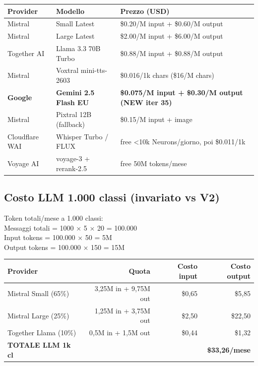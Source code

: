 \documentclass[12pt,a4paper]{article}
\begin{document}
\begin{center}
\begin{tabular}{lll}
\toprule
\textbf{Provider} & \textbf{Modello} & \textbf{Prezzo (USD)} \\
\midrule
Mistral & Small Latest          & \$0.20/M input + \$0.60/M output \\
Mistral & Large Latest          & \$2.00/M input + \$6.00/M output \\
Together AI & Llama 3.3 70B Turbo & \$0.88/M input + \$0.88/M output \\
Mistral & Voxtral mini-tts-2603 & \$0.016/1k chars (\$16/M chars) \\
\textbf{Google} & \textbf{Gemini 2.5 Flash EU} & \textbf{\$0.075/M input + \$0.30/M output (NEW iter 35)} \\
Mistral & Pixtral 12B (fallback) & \$0.15/M input + image \\
Cloudflare WAI & Whisper Turbo / FLUX & free <10k Neurons/giorno, poi \$0.011/1k \\
Voyage AI & voyage-3 + rerank-2.5 & free 50M tokens/mese \\
\bottomrule
\end{tabular}
\end{center}

\subsection*{Costo LLM 1.000 classi (invariato vs V2)}

Token totali/mese a 1.000 classi: \\
Messaggi totali = 1000 × 5 × 20 = 100.000 \\
Input tokens = 100.000 × 50 = 5M \\
Output tokens = 100.000 × 150 = 15M

\begin{center}
\begin{tabular}{lrrr}
\toprule
\textbf{Provider} & \textbf{Quota} & \textbf{Costo input} & \textbf{Costo output} \\
\midrule
Mistral Small (65\%)  & 3,25M in + 9,75M out & \$0,65 & \$5,85 \\
Mistral Large (25\%)  & 1,25M in + 3,75M out & \$2,50 & \$22,50 \\
Together Llama (10\%) & 0,5M in + 1,5M out   & \$0,44 & \$1,32 \\
\textbf{TOTALE LLM 1k cl} & & & \textbf{\$33,26/mese} \\
\bottomrule
\end{tabular}
\end{center}
\end{document}
